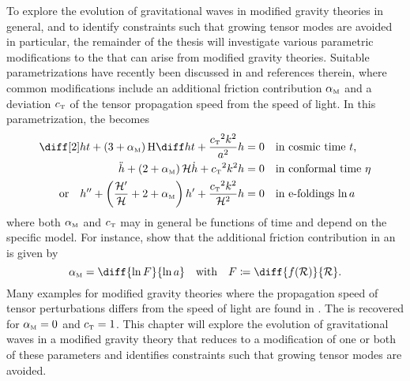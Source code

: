 \documentclass[12pt,parskip=half]{scrreprt}
\begin{document}
To explore the evolution of gravitational waves in modified gravity theories in general, and to identify constraints such that growing tensor modes are avoided in particular, the remainder of the thesis will investigate various parametric modifications to the  that can arise from modified gravity theories. Suitable parametrizations have recently been discussed in \textcite{Bellini2014,Saltas2014,Amendola2014,Raveri2014,Pettorino2014,Linder2014,Amendola2015,Xu2015} and references therein, where common modifications include an additional friction contribution \({\alpha_{\textnormal{\tiny{M}}}}\) and a deviation \({c_{\textnormal{\tiny{T}}}}\) of the tensor propagation speed from the speed of light. In this parametrization, the  becomes \autocite{Amendola2014,Raveri2014,Pettorino2014}
\begin{subequations}\label{eq:evolution_friction}
\begin{align}
	\ddt{h} + \del{3 + \alphaM} \Hcosm \dt{h} + \frac{\cT^2 k^2}{a^2} h &= 0 \quad \text{in cosmic time \(t\),} \\
	\ddconf{h} + \del{2 + \alphaM} \Hconf \dconf{h} + \cT^2 k^2 h &= 0 \quad \text{in conformal time \(\conft\)} \\
    \text{or} \quad \ddefold{h} + \del{\frac{\defold{\Hconf}}{\Hconf} + 2 + \alphaM} \defold{h} + \frac{\cT^2 k^2}{\Hconf^2} h &= 0 \quad \text{in e-foldings \(\efold\)}
\end{align}
\end{subequations}
where both \({\alpha_{\textnormal{\tiny{M}}}}\) and \({c_{\textnormal{\tiny{T}}}}\) may in general be functions of time and depend on the specific model. For instance, \textcite{Hwang1996} show that the additional friction contribution in an  is given by
\begin{equation}
	\alphaM = \diff{\ln{F}}{\efold} \quad \text{with} \quad F \defeq \diff{f(\Rscal)}{\Rscal}
	\eqpunct{.}
\end{equation}
Many examples for modified gravity theories where the propagation speed of tensor perturbations differs from the speed of light are found in \textcite{Raveri2014,Amendola2014,Linder2014}. The  is recovered for \({\alpha_{\textnormal{\tiny{M}}}}=0\) and \({c_{\textnormal{\tiny{T}}}}=1\). This chapter will explore the evolution of gravitational waves in a modified gravity theory that reduces to a modification of one or both of these parameters and identifies constraints such that growing tensor modes are avoided.
\end{document}
